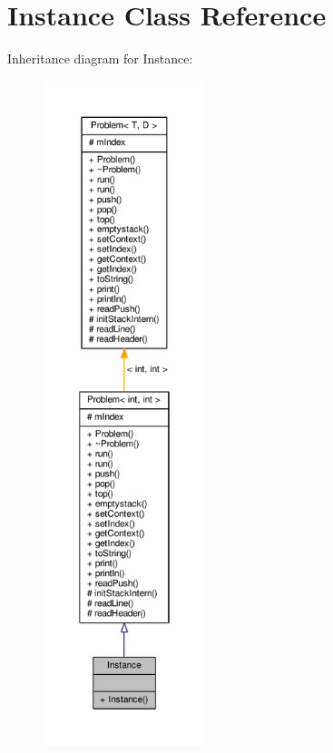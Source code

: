 \hypertarget{class_instance}{}\section{Instance Class Reference}
\label{class_instance}


Inheritance diagram for Instance\+:
\nopagebreak
\begin{figure}[H]
\begin{center}
\leavevmode
\includegraphics[height=550pt]{class_instance__inherit__graph}
\end{center}
\end{figure}


